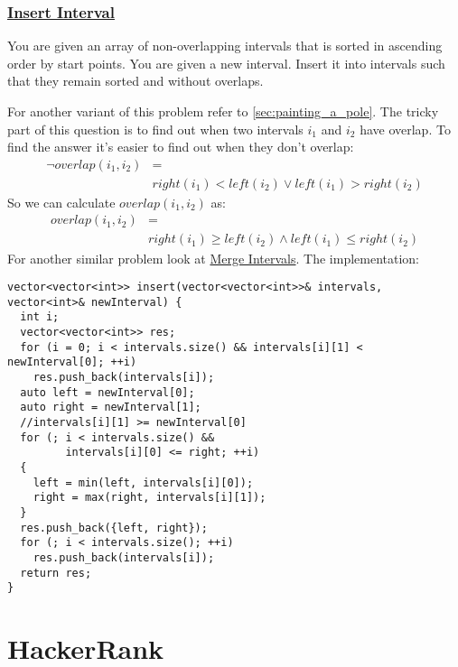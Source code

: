 \documentclass{book}
\begin{document}
	\subsection{\href{https://leetcode.com/problems/insert-interval/}{Insert Interval}}
	\label{subsec:insert_interval}
	You are given an array of non-overlapping intervals that is sorted in ascending order by start points. You are given a new interval. Insert it into intervals such that they remain sorted and without overlaps.
	\par For another variant of this problem refer to \ref{sec:painting_a_pole}. The tricky part of this question is to find out when two intervals $i_1$ and $i_2$ have overlap. To find the answer it's easier to find out when they don't overlap:
	\begin{equation*}
		\begin{split}
			\neg overlap(i_1, i_2) &= \\
			& right(i_1) < left(i_2) \lor left(i_1) > right(i_2)
		\end{split}
	\end{equation*}
	So we can calculate $overlap(i_1, i_2)$ as:
	\begin{equation*}
	\begin{split}
		overlap(i_1, i_2) &= \\
		& right(i_1) \ge left(i_2) \land left(i_1) \le right(i_2)
	\end{split}
\end{equation*}	
	For another similar problem look at \href{https://leetcode.com/problems/merge-intervals/}{Merge Intervals}. The implementation:
	\begin{lstlisting}
vector<vector<int>> insert(vector<vector<int>>& intervals, vector<int>& newInterval) {
  int i;
  vector<vector<int>> res;
  for (i = 0; i < intervals.size() && intervals[i][1] < newInterval[0]; ++i)
    res.push_back(intervals[i]);
  auto left = newInterval[0];
  auto right = newInterval[1];
  //intervals[i][1] >= newInterval[0]
  for (; i < intervals.size() &&
         intervals[i][0] <= right; ++i)
  {
    left = min(left, intervals[i][0]);
    right = max(right, intervals[i][1]);
  }
  res.push_back({left, right});
  for (; i < intervals.size(); ++i)
    res.push_back(intervals[i]);
  return res;
}
	\end{lstlisting}
	\chapter{HackerRank}
\end{document}
